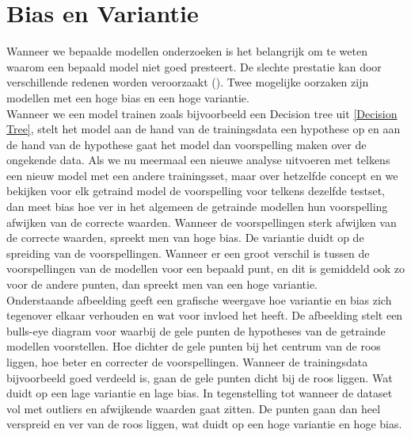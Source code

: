 %
\section{Bias en Variantie}\label{Bias en Variantie}

Wanneer we bepaalde modellen onderzoeken is het belangrijk om te weten waarom een bepaald model niet goed presteert. De slechte prestatie kan door verschillende redenen worden veroorzaakt (\cite{mitchell1997machine}). Twee mogelijke oorzaken zijn modellen met een hoge bias en een hoge variantie.\\
%
%
Wanneer we een model trainen zoals bijvoorbeeld een Decision tree uit \ref{Decision Tree}, stelt het model aan de hand van de trainingsdata een hypothese op en aan de hand van de hypothese gaat het model dan voorspelling maken over de ongekende data. Als we nu meermaal een nieuwe analyse uitvoeren met telkens een nieuw model met een andere trainingsset, maar over hetzelfde concept en we bekijken voor elk getraind model de voorspelling voor telkens dezelfde testset, dan meet bias hoe ver in het algemeen de getrainde modellen hun voorspelling afwijken van de correcte waarden. Wanneer de voorspellingen sterk afwijken van de correcte waarden, spreekt men van hoge bias.  De variantie duidt op de spreiding van de voorspellingen. Wanneer er een groot verschil is tussen de voorspellingen van de modellen voor een bepaald punt, en dit is gemiddeld ook zo voor de andere punten, dan spreekt men van een hoge variantie.\\
%
Onderstaande afbeelding geeft een grafische weergave hoe variantie en bias zich tegenover elkaar verhouden en wat voor invloed het heeft.
De afbeelding stelt een bulls-eye diagram voor waarbij de gele punten de hypotheses van de getrainde modellen voorstellen. Hoe dichter de gele punten bij het centrum van de roos liggen, hoe beter en correcter de voorspellingen. Wanneer de trainingsdata bijvoorbeeld goed verdeeld is, gaan de gele punten dicht bij de roos liggen. Wat duidt op een lage variantie en lage bias. In tegenstelling tot wanneer de dataset vol met outliers en afwijkende waarden gaat zitten. De punten gaan dan heel verspreid en ver van de roos liggen, wat duidt op een hoge variantie en hoge bias.\\
%

